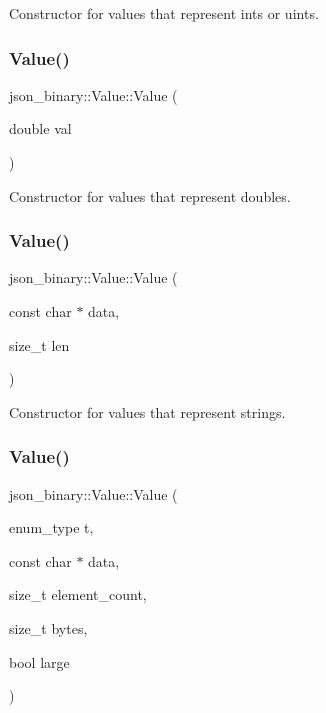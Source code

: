 Constructor for values that represent ints or uints. \mbox{\label{classjson__binary_1_1Value_a73ddf21993bc1e863b1848b362681dad}} 
\subsubsection{\texorpdfstring{Value()}{Value()}\hspace{0.1cm}{\footnotesize\ttfamily [3/8]}}
{\footnotesize\ttfamily json\+\_\+binary\+::\+Value\+::\+Value (\begin{DoxyParamCaption}\item[{double}]{val }\end{DoxyParamCaption})\hspace{0.3cm}{\ttfamily [explicit]}}

Constructor for values that represent doubles. \mbox{\label{classjson__binary_1_1Value_adad7db231ae7f2d1c262e1631fa0e7f2}} 
\subsubsection{\texorpdfstring{Value()}{Value()}\hspace{0.1cm}{\footnotesize\ttfamily [4/8]}}
{\footnotesize\ttfamily json\+\_\+binary\+::\+Value\+::\+Value (\begin{DoxyParamCaption}\item[{const char $\ast$}]{data,  }\item[{size\+\_\+t}]{len }\end{DoxyParamCaption})}

Constructor for values that represent strings. \mbox{\label{classjson__binary_1_1Value_a6d8722c6f014798bbda4ff8243ee1d64}} 
\subsubsection{\texorpdfstring{Value()}{Value()}\hspace{0.1cm}{\footnotesize\ttfamily [5/8]}}
{\footnotesize\ttfamily json\+\_\+binary\+::\+Value\+::\+Value (\begin{DoxyParamCaption}\item[{enum\+\_\+type}]{t,  }\item[{const char $\ast$}]{data,  }\item[{size\+\_\+t}]{element\+\_\+count,  }\item[{size\+\_\+t}]{bytes,  }\item[{bool}]{large }\end{DoxyParamCaption})}

